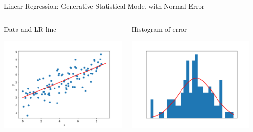 \documentclass[aspectratio=169]{beamer}
\begin{document}
\begin{frame}{Linear Regression: Generative Statistical Model with Normal Error}

\begin{columns}
\begin{column}{0.5\textwidth}
\begin{center}Data and LR line
\end{center}
     \includegraphics[width=1\textwidth]{lectGLM/LRgenmodel1.png} 
 \end{column}
\begin{column}{0.5\textwidth}
\begin{center}Histogram of error
\end{center}

     \includegraphics[width=1\textwidth]{lectGLM/LRgenmodelError.png} 
\end{column}
 \end{columns}

\end{frame}
\end{document}
